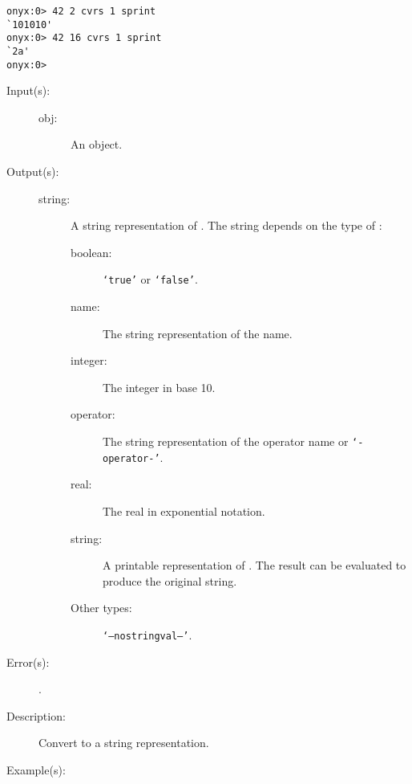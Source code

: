 \begin{description}
\begin{description}
\begin{verbatim}
onyx:0> 42 2 cvrs 1 sprint
`101010'
onyx:0> 42 16 cvrs 1 sprint
`2a'
onyx:0>
		\end{verbatim}
	\end{description}
\label{systemdict:cvs}
\item[{\onyxop{obj}{cvs}{string}}: ]
	\begin{description}\item[]
	\item[Input(s): ]
		\begin{description}\item[]
		\item[obj: ]
			An object.
		\end{description}
	\item[Output(s): ]
		\begin{description}\item[]
		\item[string: ]
			A string representation of .  The string
			depends on the type of :
			\begin{description}
			\item[boolean: ] {\tt `true'} or  {\tt `false'}.
			\item[name: ] The string representation of the name.
			\item[integer: ] The integer in base 10.
			\item[operator: ] The string representation of the
			operator name or {\tt `-operator-'}.
			\item[real: ] The real in exponential notation.
			\item[string: ] A printable representation of
			.  The result can be evaluated to produce
			the original string.
			\item[Other types: ] {\tt `--nostringval--'}.
			\end{description}
		\end{description}
	\item[Error(s): ]
		\begin{description}\item[]
		\item[.]
		\end{description}
	\item[Description: ]
		Convert  to a string representation.
	\item[Example(s): ]\begin{verbatim}


\end{verbatim}
\end{description}
\end{description}
